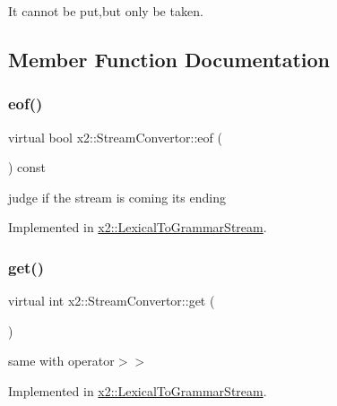 It cannot be put,but only be taken. 

\subsection{Member Function Documentation}
\mbox{\label{classx2_1_1_stream_convertor_a64febc08c310555497ca497df583b940}} 
\subsubsection{\texorpdfstring{eof()}{eof()}}
{\footnotesize\ttfamily virtual bool x2\+::\+Stream\+Convertor\+::eof (\begin{DoxyParamCaption}{ }\end{DoxyParamCaption}) const\hspace{0.3cm}{\ttfamily [pure virtual]}}

judge if the stream is coming its ending 

Implemented in \hyperlink{classx2_1_1_lexical_to_grammar_stream_a813ec919763970d4150f35cba4da1db1}{x2\+::\+Lexical\+To\+Grammar\+Stream}.

\mbox{\label{classx2_1_1_stream_convertor_a1025f8d8b1b1e430a6476d74e2506b10}} 
\subsubsection{\texorpdfstring{get()}{get()}}
{\footnotesize\ttfamily virtual int x2\+::\+Stream\+Convertor\+::get (\begin{DoxyParamCaption}{ }\end{DoxyParamCaption})\hspace{0.3cm}{\ttfamily [pure virtual]}}

same with operator$>$$>$ 

Implemented in \hyperlink{classx2_1_1_lexical_to_grammar_stream_a8ae8e1b6ada26785c70db1255daca798}{x2\+::\+Lexical\+To\+Grammar\+Stream}.

\mbox{\label{classx2_1_1_stream_convertor_a5b387cc560794db5ac2f0c35dd4023d1}} 
